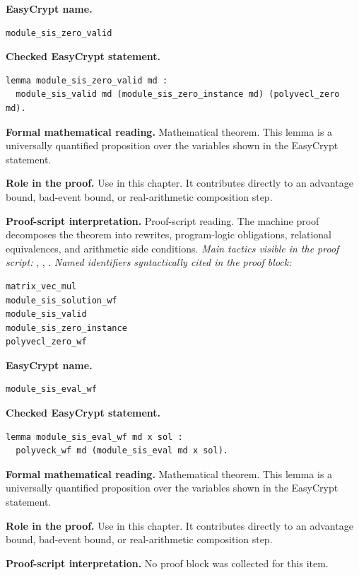 \begin{formaltheorem}
\noindent\textbf{EasyCrypt name.}
\begin{lstlisting}[language=EasyCrypt,basicstyle=\ttfamily\scriptsize]
module_sis_zero_valid
\end{lstlisting}
\noindent\textbf{Checked EasyCrypt statement.}
\begin{lstlisting}[language=EasyCrypt,basicstyle=\ttfamily\scriptsize]
lemma module_sis_zero_valid md :
  module_sis_valid md (module_sis_zero_instance md) (polyvecl_zero md).
\end{lstlisting}
\noindent\textbf{Formal mathematical reading.}
Mathematical theorem. This lemma is a universally quantified proposition over the variables shown in the EasyCrypt statement.

\noindent\textbf{Role in the proof.}
Use in this chapter. It contributes directly to an advantage bound, bad-event bound, or real-arithmetic composition step.

\noindent\textbf{Proof-script interpretation.}
Proof-script reading. The machine proof decomposes the theorem into rewrites, program-logic obligations, relational equivalences, and arithmetic side conditions.
\emph{Main tactics visible in the proof script:} , , .
\emph{Named identifiers syntactically cited in the proof block:}
\begin{lstlisting}[language=EasyCrypt,basicstyle=\ttfamily\scriptsize]
matrix_vec_mul
module_sis_solution_wf
module_sis_valid
module_sis_zero_instance
polyvecl_zero_wf
\end{lstlisting}

\end{formaltheorem}

\begin{formaltheorem}
\noindent\textbf{EasyCrypt name.}
\begin{lstlisting}[language=EasyCrypt,basicstyle=\ttfamily\scriptsize]
module_sis_eval_wf
\end{lstlisting}
\noindent\textbf{Checked EasyCrypt statement.}
\begin{lstlisting}[language=EasyCrypt,basicstyle=\ttfamily\scriptsize]
lemma module_sis_eval_wf md x sol :
  polyveck_wf md (module_sis_eval md x sol).
\end{lstlisting}
\noindent\textbf{Formal mathematical reading.}
Mathematical theorem. This lemma is a universally quantified proposition over the variables shown in the EasyCrypt statement.

\noindent\textbf{Role in the proof.}
Use in this chapter. It contributes directly to an advantage bound, bad-event bound, or real-arithmetic composition step.

\noindent\textbf{Proof-script interpretation.}
No proof block was collected for this item.

\end{formaltheorem}

